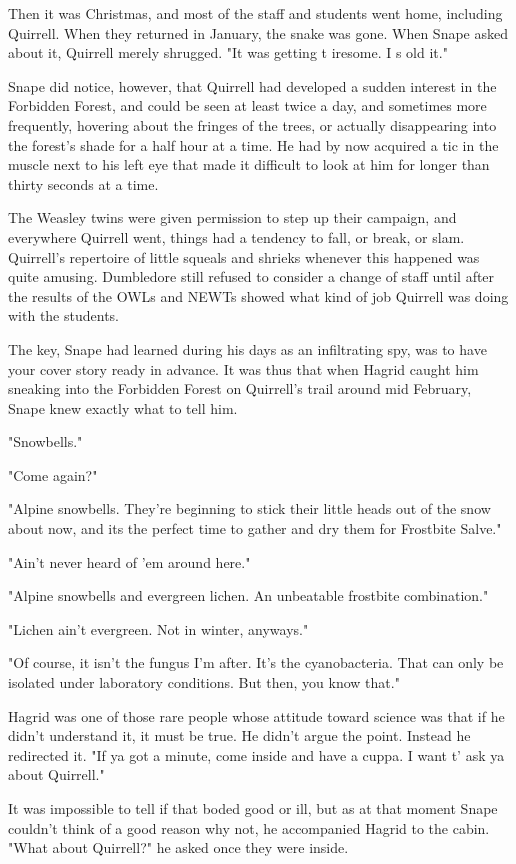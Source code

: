 Then it was Christmas, and most of the staff and students went home, including Quirrell. When they returned in January, the snake was gone. When Snape asked about it, Quirrell merely shrugged. "It was getting t{\el} iresome. I s{\el} old it."

Snape did notice, however, that Quirrell had developed a sudden interest in the Forbidden Forest, and could be seen at least twice a day, and sometimes more frequently, hovering about the fringes of the trees, or actually disappearing into the forest's shade for a half hour at a time. He had by now acquired a tic in the muscle next to his left eye that made it difficult to look at him for longer than thirty seconds at a time.

The Weasley twins were given permission to step up their campaign, and everywhere Quirrell went, things had a tendency to fall, or break, or slam. Quirrell's repertoire of little squeals and shrieks whenever this happened was quite amusing. Dumbledore still refused to consider a change of staff until after the results of the OWLs and NEWTs showed what kind of job Quirrell was doing with the students.

The key, Snape had learned during his days as an infiltrating spy, was to have your cover story ready in advance. It was thus that when Hagrid caught him sneaking into the Forbidden Forest on Quirrell's trail around mid February, Snape knew exactly what to tell him.

"Snowbells."

"Come again?"

"Alpine snowbells. They're beginning to stick their little heads out of the snow about now, and its the perfect time to gather and dry them for Frostbite Salve."

"Ain't never heard of 'em around here."

"Alpine snowbells and evergreen lichen. An unbeatable frostbite combination."

"Lichen ain't evergreen. Not in winter, anyways."

"Of course, it isn't the fungus I'm after. It's the cyanobacteria. That can only be isolated under laboratory conditions. But then, you know that."

Hagrid was one of those rare people whose attitude toward science was that if he didn't understand it, it must be true. He didn't argue the point. Instead he redirected it. "If ya got a minute, come inside and have a cuppa. I want t' ask ya about Quirrell."

It was impossible to tell if that boded good or ill, but as at that moment Snape couldn't think of a good reason why not, he accompanied Hagrid to the cabin. "What about Quirrell?" he asked once they were inside.

